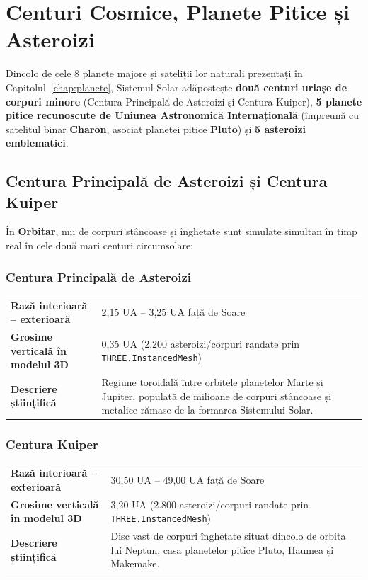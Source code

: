 \chapter{Centuri Cosmice, Planete Pitice și Asteroizi}
\label{chap:corpuri-sistem-solar}

Dincolo de cele 8 planete majore și sateliții lor naturali prezentați în Capitolul~\ref{chap:planete}, Sistemul Solar adăpostește \textbf{două centuri uriașe de corpuri minore} (Centura Principală de Asteroizi și Centura Kuiper), \textbf{5 planete pitice recunoscute de Uniunea Astronomică Internațională} (împreună cu satelitul binar \textbf{Charon}, asociat planetei pitice \textbf{Pluto}) și \textbf{5 asteroizi emblematici}.

\section{Centura Principală de Asteroizi și Centura Kuiper}
\label{sec:centuri}

În \textbf{Orbitar}, mii de corpuri stâncoase și înghețate sunt simulate simultan în timp real în cele două mari centuri circumsolare:


\subsection{Centura Principală de Asteroizi}
\begin{tcolorbox}[orbitardata, title={\textbf{Parametrii Regiunii Toroidale — Centura Principală de Asteroizi}}]
\begin{tabularx}{\textwidth}{@{}lX@{}}
\textbf{Rază interioară -- exterioară} & 2,15 UA -- 3,25 UA față de Soare \\
\textbf{Grosime verticală în modelul 3D} & 0,35 UA (2.200 asteroizi/corpuri randate prin \texttt{THREE.InstancedMesh}) \\
\textbf{Descriere științifică} & Regiune toroidală între orbitele planetelor Marte și Jupiter, populată de milioane de corpuri stâncoase și metalice rămase de la formarea Sistemului Solar. \\
\end{tabularx}
\end{tcolorbox}


\subsection{Centura Kuiper}
\begin{tcolorbox}[orbitardata, title={\textbf{Parametrii Regiunii Toroidale — Centura Kuiper}}]
\begin{tabularx}{\textwidth}{@{}lX@{}}
\textbf{Rază interioară -- exterioară} & 30,50 UA -- 49,00 UA față de Soare \\
\textbf{Grosime verticală în modelul 3D} & 3,20 UA (2.800 asteroizi/corpuri randate prin \texttt{THREE.InstancedMesh}) \\
\textbf{Descriere științifică} & Disc vast de corpuri înghețate situat dincolo de orbita lui Neptun, casa planetelor pitice Pluto, Haumea și Makemake. \\
\end{tabularx}
\end{tcolorbox}


